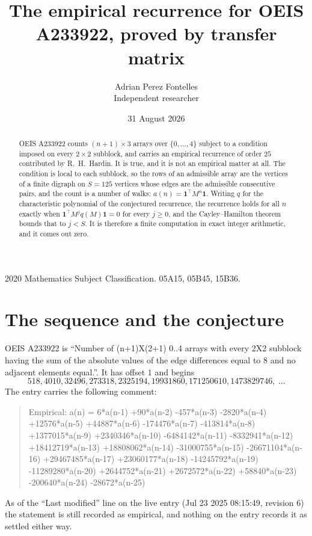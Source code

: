 \documentclass[11pt,a4paper]{article}
\title{The empirical recurrence for OEIS A233922, proved by transfer matrix}
\author{Adrian Perez Fontelles\\ \small Independent researcher}
\date{31 August 2026}
\theoremstyle{plain}
\theoremstyle{definition}
\begin{document}
\maketitle

\begin{abstract}
OEIS A233922 counts $(n+1)\times3$ arrays over $\{0,\dots,4\}$ subject to a condition imposed on
every $2\times2$ subblock, and carries an empirical recurrence of order $25$ contributed
by R.~H.~Hardin. It is true, and it is not an empirical matter at all. The condition is local
to each subblock, so the rows of an admissible array are the vertices of a finite digraph
on $S=125$ vertices whose edges are the admissible consecutive pairs, and the count is a
number of walks: $a(n)=\mathbf{1}^{\!\top}M^{n}\mathbf{1}$. Writing $q$
for the characteristic polynomial of the conjectured recurrence, the recurrence holds for all
$n$ exactly when $\mathbf{1}^{\!\top}M^{j}q(M)\mathbf{1}=0$ for every $j\ge0$, and the
Cayley--Hamilton theorem bounds that to $j<S$. It is therefore a finite computation in exact
integer arithmetic, and it comes out zero.
\end{abstract}

\noindent\small 2020 Mathematics Subject Classification. 05A15, 05B45, 15B36.\normalsize

\section{The sequence and the conjecture}

OEIS A233922 is ``Number of (n+1)X(2+1) 0..4 arrays with every 2X2 subblock having the sum of the absolute values of the edge differences equal to 8 and no adjacent elements equal.''. It has offset $1$ and begins
\[
518, 4010, 32496, 273318, 2325194, 19931860, 171250610, 1473829746,\ \dots
\]
The entry carries the following comment:
\begin{quote}\small
Empirical: a(n) = 6*a(n-1) +90*a(n-2) -457*a(n-3) -2820*a(n-4) +12576*a(n-5) +44887*a(n-6) -174476*a(n-7) -413814*a(n-8) +1377015*a(n-9) +2340346*a(n-10) -6484142*a(n-11) -8332941*a(n-12) +18412719*a(n-13) +18808062*a(n-14) -31000755*a(n-15) -26671104*a(n-16) +29467485*a(n-17) +23060177*a(n-18) -14245792*a(n-19) -11289280*a(n-20) +2644752*a(n-21) +2672572*a(n-22) +58840*a(n-23) -200640*a(n-24) -28672*a(n-25)
\end{quote}
As of the ``Last modified'' line on the live entry (Jul 23 2025 08:15:49, revision 6) the statement is
still recorded as empirical, and nothing on the entry records it as settled either way.
\end{document}
